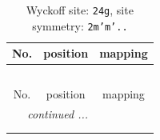\documentclass[fleqn,8pt]{jsarticle}
\begin{document}
\renewcommand{\arraystretch}{1.2}
\begin{longtable}{ccc}
\caption{Wyckoff site: {\tt 24g}, site symmetry: {\tt 2m'm'..}}
 \\
 \hline \hline
No. & position & mapping \\ \hline \endfirsthead

\multicolumn{2}{l}{\tablename\ \thetable{}} \\
 \hline \hline
No. & position & mapping \\ \hline \endhead

 \hline \hline
\multicolumn{2}{r}{\footnotesize\it continued ...} \\ \endfoot

 \hline \hline
\multicolumn{2}{r}{} \\ \endlastfoot


\end{longtable}
\end{document}
